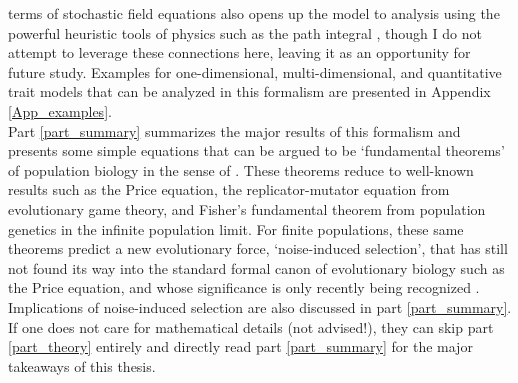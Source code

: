 terms of stochastic field equations also opens up the model to analysis using the powerful heuristic tools of physics such as the path integral \citep{doi_second_1976, peliti_path_1985, dodd_many-body_2009, chow_path_2015, weber_master_2017}, though I do not attempt to leverage these connections here, leaving it as an opportunity for future study. Examples for one-dimensional, multi-dimensional, and quantitative trait models that can be analyzed in this formalism are presented in Appendix \ref{App_examples}.\\
Part \ref{part_summary} summarizes the major results of this formalism and presents some simple equations that can be argued to be `fundamental theorems' of population biology in the sense of \cite{queller_fundamental_2017}. These theorems reduce to well-known results such as the Price equation, the replicator-mutator equation from evolutionary game theory, and Fisher's fundamental theorem from population genetics in the infinite population limit. For finite populations, these same theorems predict a new evolutionary force, `noise-induced selection', that has still not found its way into the standard formal canon of evolutionary biology such as the Price equation, and whose significance is only recently being recognized \citep{constable_demographic_2016,mcleod_social_2019,mazzolini_universality_2022, kuosmanen_turnover_2022}. Implications of noise-induced selection are also discussed in part \ref{part_summary}. If one does not care for mathematical details (not advised!), they can skip part \ref{part_theory} entirely and directly read part \ref{part_summary} for the major takeaways of this thesis.

